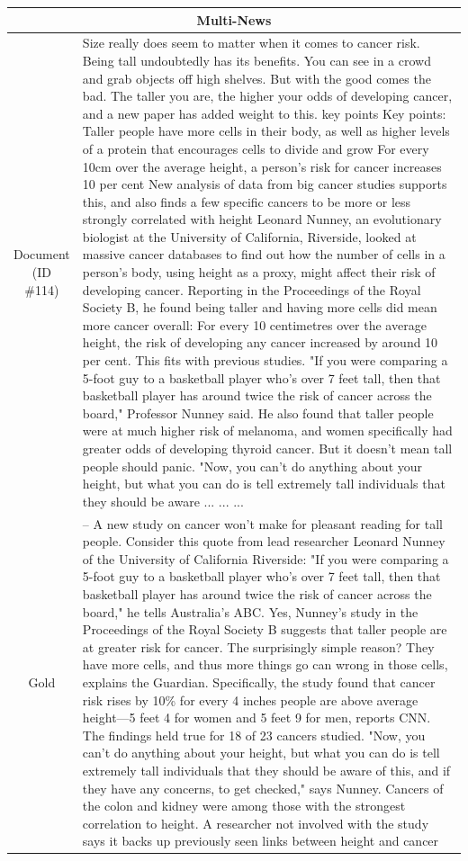 \begin{table}[bth!]
\scriptsize
\centering
\renewcommand{\arraystretch}{1.3}
\begin{tabular}{c|p{}}
\hline
\multicolumn{2}{c}{Multi-News} \\ \hline
\makecell{Document\\(ID \#114)} & 
Size really does seem to matter when it comes to cancer risk. Being tall undoubtedly has its benefits. You can see in a crowd and grab objects off high shelves. But with the good comes the bad. The taller you are, the higher your odds of developing cancer, and a new paper has added weight to this. key points Key points: Taller people have more cells in their body, as well as higher levels of a protein that encourages cells to divide and grow For every 10cm over the average height, a person's risk for cancer increases 10 per cent New analysis of data from big cancer studies supports this, and also finds a few specific cancers to be more or less strongly correlated with height Leonard Nunney, an evolutionary biologist at the University of California, Riverside, looked at massive cancer databases to find out how the number of cells in a person's body, using height as a proxy, might affect their risk of developing cancer. Reporting in the Proceedings of the Royal Society B, he found being taller and having more cells did mean more cancer overall: For every 10 centimetres over the average height, the risk of developing any cancer increased by around 10 per cent. This fits with previous studies. "If you were comparing a 5-foot guy to a basketball player who's over 7 feet tall, then that basketball player has around twice the risk of cancer across the board," Professor Nunney said. He also found that taller people were at much higher risk of melanoma, and women specifically had greater odds of developing thyroid cancer. But it doesn't mean tall people should panic. "Now, you can't do anything about your height, but what you can do is tell extremely tall individuals that they should be aware ... ... ... 
\\ \hline
Gold & 
– A new study on cancer won't make for pleasant reading for tall people. Consider this quote from lead researcher Leonard Nunney of the University of California Riverside: "If you were comparing a 5-foot guy to a basketball player who's over 7 feet tall, then that basketball player has around twice the risk of cancer across the board," he tells Australia's ABC. Yes, Nunney's study in the Proceedings of the Royal Society B suggests that taller people are at greater risk for cancer. The surprisingly simple reason? They have more cells, and thus more things go can wrong in those cells, explains the Guardian. Specifically, the study found that cancer risk rises by 10\% for every 4 inches people are above average height—5 feet 4 for women and 5 feet 9 for men, reports CNN. The findings held true for 18 of 23 cancers studied. "Now, you can't do anything about your height, but what you can do is tell extremely tall individuals that they should be aware of this, and if they have any concerns, to get checked," says Nunney. Cancers of the colon and kidney were among those with the strongest correlation to height. A researcher not involved with the study says it backs up previously seen links between height and cancer

\end{tabular}
\end{table}
